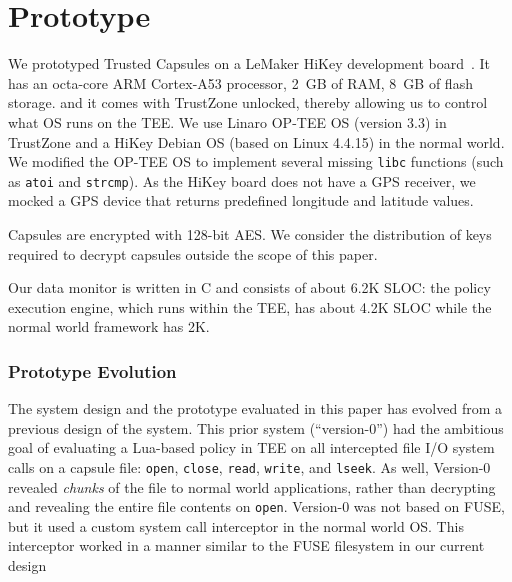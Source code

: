 \chapter{Prototype}
\label{sec:implement}

We prototyped Trusted Capsules on a LeMaker HiKey development
board~\cite{hikey}. It has an octa-core ARM Cortex-A53 processor, 2~GB
of RAM, 8~GB of flash storage. and it comes with TrustZone unlocked,
thereby allowing us to control what OS runs on the TEE. We use Linaro
OP-TEE OS (version 3.3) in TrustZone and a HiKey Debian OS (based on
Linux 4.4.15) in the normal world. We modified the OP-TEE OS to
implement several missing {\tt libc} functions (such as {\tt atoi} and
{\tt strcmp}). As the HiKey board does not have a GPS receiver, we
mocked a GPS device that returns predefined longitude and latitude
values.

Capsules are encrypted with 128-bit AES. We consider the distribution
of keys required to decrypt capsules outside the scope of this paper.

Our data monitor is written in C and consists of about 6.2K SLOC: the
policy execution engine, which runs within the TEE, has about 4.2K
SLOC while the normal world framework has 2K.

\subsection{Prototype Evolution}\label{sub:proto-prototype}

The system design and the prototype evaluated in this paper has
evolved from a previous design of the system. This prior system
(``version-0'') had the ambitious goal of evaluating a Lua-based
policy in TEE on all intercepted file I/O system calls on a capsule
file: \texttt{open}, \texttt{close}, \texttt{read}, \texttt{write},
and \texttt{lseek}. As well, Version-0 revealed \emph{chunks} of the
file to normal world applications, rather than decrypting and
revealing the entire file contents on \texttt{open}. Version-0 was not
based on FUSE, but it used a custom system call interceptor in the
normal world OS. This interceptor worked in a manner similar to the
FUSE filesystem in our current design

